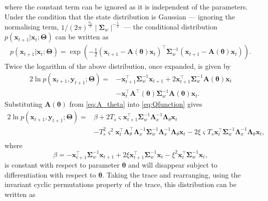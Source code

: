 \documentclass[11pt,draftcls,onecolumn,peerreview]{IEEEtran}
\begin{document}
where the constant term can be ignored as it is independent of the parameters. Under the condition that the state distribution is Gaussian --- ignoring the normalising term, $1/(2\pi)^{\frac{n_x}{2}}\mid\boldsymbol\Sigma_w\mid^{-\frac{1}{2}}$ --- the conditional distribution $p(\mathbf x_{t+1} | \mathbf x_{t};\boldsymbol\Theta)$ can be written as
\begin{align}
p(\mathbf x_{t+1} | \mathbf x_{t};\boldsymbol\Theta)=  \exp\left({-\frac{1}{2}\left(\mathbf x_{t+1}-\mathbf A\left(\boldsymbol\theta\right)\mathbf  x_t\right)^\top\boldsymbol\Sigma_w^{-1}\left(\mathbf x_{t+1}-\mathbf A\left(\boldsymbol\theta\right)\mathbf  x_t\right)}\right).
\end{align}
Twice the logarithm of the above distribution, once expanded, is given by
\begin{align}\label{eq:Qfunction}
2\ln p(\mathbf x_{t+1} , \mathbf y_{t+1};\boldsymbol\Theta)=&-\mathbf x_{t+1}^\top\boldsymbol\Sigma_w^{-1}\mathbf x_{t+1}+2\mathbf x_{t+1}^\top\boldsymbol\Sigma_w^{-1}\mathbf A( \boldsymbol\theta)\mathbf x_t\nonumber \\
&-\mathbf x_t^\top\mathbf A^\top(\boldsymbol\theta)\boldsymbol\Sigma_w^{-1}\mathbf A(\boldsymbol\theta)\mathbf x_t.
\end{align}
Substituting $\mathbf A( \boldsymbol\theta)$ from \eqref{eq:A_theta} into \eqref{eq:Qfunction} gives
\begin{align}
2\ln p(\mathbf x_{t+1}, \mathbf y_{t+1};\boldsymbol\Theta)=&\beta+2 T_s\varsigma\mathbf x_{t+1}^\top\boldsymbol\Sigma_w^{-1}\boldsymbol\Lambda_x^{-1}\boldsymbol\Lambda_{\theta}\mathbf x_t \nonumber \\
&-T_s^2\varsigma^2\mathbf x_t^\top \boldsymbol\Lambda_{\theta}^\top\boldsymbol\Lambda_x^{-1}\boldsymbol\Sigma_w^{-1}\boldsymbol\Lambda_x^{-1}\boldsymbol\Lambda_{\theta}\mathbf x_t-2\xi \varsigma T_s\mathbf x_t^\top\boldsymbol\Sigma_w^{-1}\boldsymbol\Lambda_x^{-1}\boldsymbol\Lambda_{\theta}\mathbf x_t,\nonumber \\
\end{align}
where 
\begin{equation}
\beta=-\mathbf x_{t+1}^\top\boldsymbol\Sigma_w^{-1}\mathbf x_{t+1}+2\xi\mathbf x_{t+1}^\top\boldsymbol\Sigma_w^{-1}\mathbf x_t-\xi^2\mathbf x_t^\top\boldsymbol\Sigma_w^{-1}\mathbf x_t,
\end{equation}
is constant with respect to parameter $\boldsymbol\theta$ and will disappear subject to differentiation with respect to $\boldsymbol\theta$. Taking the trace and rearranging, using the invariant cyclic permutations property of the trace, this distribution can be written as
\end{document}
